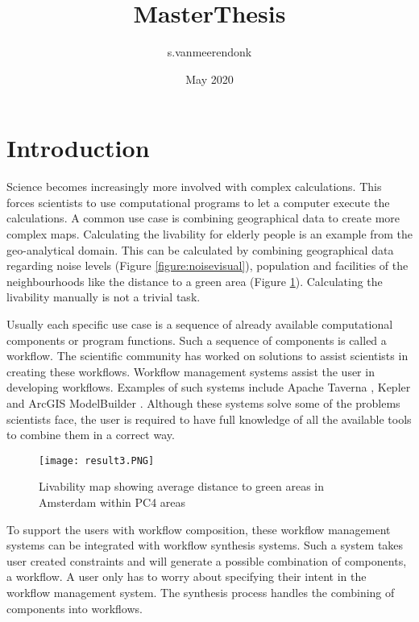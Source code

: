 \documentclass{article}
\title{MasterThesis}
\author{s.vanmeerendonk }
\date{May 2020}
\begin{document}
\maketitle

\section{Introduction}
Science becomes increasingly more involved with complex calculations. This forces scientists to  use computational programs to let a computer execute the calculations. A common use case is combining geographical data to create more complex maps. Calculating the livability for elderly people \cite{scheider2009ontology} is an example from the geo-analytical domain. 
This can be calculated by combining geographical data regarding noise levels (Figure \ref{figure:noisevisual}), population and facilities of the neighbourhoods like the distance to a green area (Figure \ref{figure:livability}). Calculating the livability manually  is not a trivial task. 

Usually each specific use case is a sequence of already available computational components or program functions. Such a sequence of components is called a workflow. The scientific community has worked on solutions to assist scientists in creating these workflows. Workflow management systems assist the user in developing workflows. Examples of such systems include Apache Taverna \cite{wolstencroft2013taverna}, Kepler \cite{altintas2004kepler} and ArcGIS ModelBuilder \cite{allen2011getting}. Although these systems solve some of the problems scientists face, the user is required to have full knowledge of all the available tools to combine them in a correct way. 



\begin{figure}
  \centering
    \texttt{[image: result3.PNG]}
    \caption{Livability map showing average distance to green areas in Amsterdam within PC4 areas }
    \label{figure:livability}
\end{figure}

To support the users with workflow composition, these workflow management systems can be integrated with workflow synthesis systems. Such a system takes user created constraints and will generate a possible combination of components, a workflow. A user only has to worry about specifying their intent in the workflow management system. The synthesis process handles the combining of components into workflows. 
\end{document}
